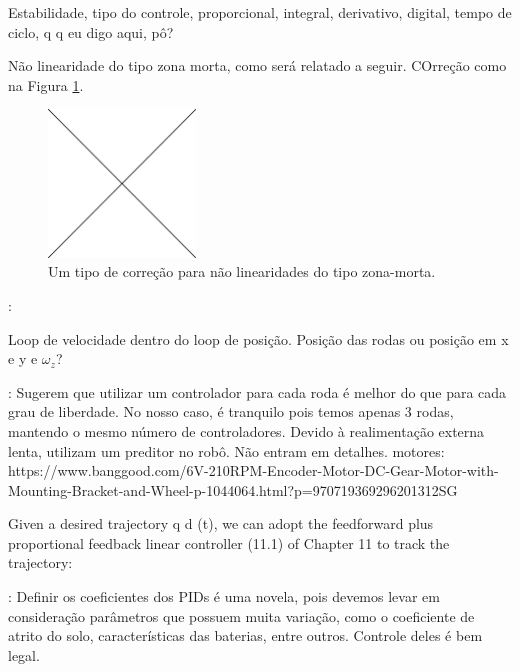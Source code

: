 Estabilidade, tipo do controle, proporcional, integral, derivativo, digital, tempo de ciclo, q q eu digo aqui, pô?

Não linearidade do tipo zona morta, como será relatado a seguir. COrreção como na Figura \ref{fig:cont_zm}.

\begin{figure}[h]
  \centering
  \includegraphics[width = 0.35\textwidth]{imagens/edc}
  \caption{Um tipo de correção para não linearidades do tipo zona-morta.}
  \label{fig:cont_zm}
\end{figure}


\citet{lynch2017modern}:

Loop de velocidade dentro do loop de posição. Posição das rodas ou posição em x e y e $\omega_z$?



\citet{rojas2006holonomic}: Sugerem que utilizar um controlador para cada roda é melhor do que para cada grau de liberdade. No nosso caso, é tranquilo pois temos apenas 3 rodas, mantendo o mesmo número de controladores. Devido à realimentação externa lenta, utilizam um preditor no robô. Não entram em detalhes.
motores:
https://www.banggood.com/6V-210RPM-Encoder-Motor-DC-Gear-Motor-with-Mounting-Bracket-and-Wheel-p-1044064.html?p=970719369296201312SG

Given a desired trajectory q d (t), we can adopt the feedforward plus proportional feedback linear controller (11.1) of Chapter 11 to track the trajectory: \cite{lynch2017modern}

\cite{samani2007comprehensive}: Definir os coeficientes dos PIDs é uma novela, pois devemos levar em consideração parâmetros que possuem muita variação, como o coeficiente de atrito do solo, características das baterias, entre outros. Controle deles é bem legal.


